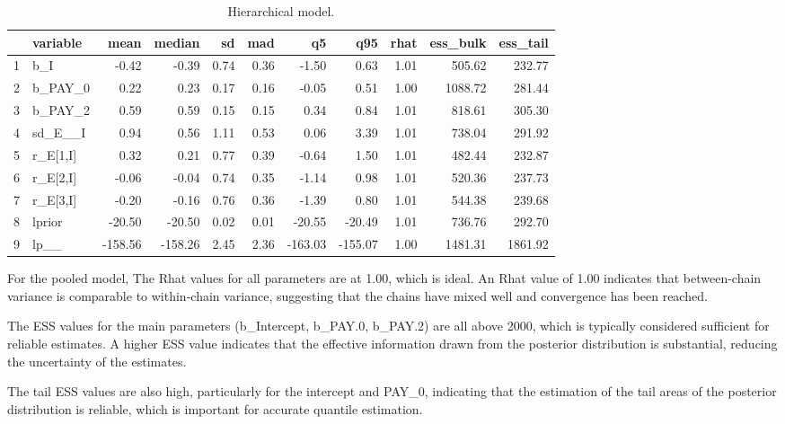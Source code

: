 \documentclass[a4paper]{artikel3}
\begin{document}
\begin{table}[ht]
\centering
\begin{tabular}{rlrrrrrrrrr}
  \hline
 & variable & mean & median & sd & mad & q5 & q95 & rhat & ess\_bulk & ess\_tail \\ 
  \hline
1 & b\_I & -0.42 & -0.39 & 0.74 & 0.36 & -1.50 & 0.63 & 1.01 & 505.62 & 232.77 \\ 
  2 & b\_PAY\_0 & 0.22 & 0.23 & 0.17 & 0.16 & -0.05 & 0.51 & 1.00 & 1088.72 & 281.44 \\ 
  3 & b\_PAY\_2 & 0.59 & 0.59 & 0.15 & 0.15 & 0.34 & 0.84 & 1.01 & 818.61 & 305.30 \\ 
  4 & sd\_E\_\_I & 0.94 & 0.56 & 1.11 & 0.53 & 0.06 & 3.39 & 1.01 & 738.04 & 291.92 \\ 
  5 & r\_E[1,I] & 0.32 & 0.21 & 0.77 & 0.39 & -0.64 & 1.50 & 1.01 & 482.44 & 232.87 \\ 
  6 & r\_E[2,I] & -0.06 & -0.04 & 0.74 & 0.35 & -1.14 & 0.98 & 1.01 & 520.36 & 237.73 \\ 
  7 & r\_E[3,I] & -0.20 & -0.16 & 0.76 & 0.36 & -1.39 & 0.80 & 1.01 & 544.38 & 239.68 \\ 
  8 & lprior & -20.50 & -20.50 & 0.02 & 0.01 & -20.55 & -20.49 & 1.01 & 736.76 & 292.70 \\ 
  9 & lp\_\_ & -158.56 & -158.26 & 2.45 & 2.36 & -163.03 & -155.07 & 1.00 & 1481.31 & 1861.92 \\ 
   \hline
\end{tabular}
  \caption{Hierarchical model.%
  }
  \label{tab:diag-hier}
\end{table}

For the pooled model, The Rhat values for all parameters are at 1.00, which is ideal. An Rhat value of 1.00 indicates that between-chain variance is comparable to within-chain variance, suggesting that the chains have mixed well and convergence has been reached.

 The ESS values for the main parameters (b\_Intercept, b\_PAY.0, b\_PAY.2) are all above 2000, which is typically considered sufficient for reliable estimates. A higher ESS value indicates that the effective information drawn from the posterior distribution is substantial, reducing the uncertainty of the estimates.

The tail ESS values are also high, particularly for the intercept and PAY\_0, indicating that the estimation of the tail areas of the posterior distribution is reliable, which is important for accurate quantile estimation.
\end{document}
